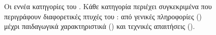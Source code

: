 \begin{figure}[htbp]
\begin{chapterfigurebox}
\begin{tikzpicture}
\end{tikzpicture}
\end{chapterfigurebox}
\caption{Οι εννέα κατηγορίες του   . Κάθε κατηγορία περιέχει συγκεκριμένα  που περιγράφουν διαφορετικές πτυχές του  : από γενικές πληροφορίες () μέχρι παιδαγωγικά χαρακτηριστικά () και τεχνικές απαιτήσεις ().}
\label{fig:scorm12_lom_categories}
\end{figure}
